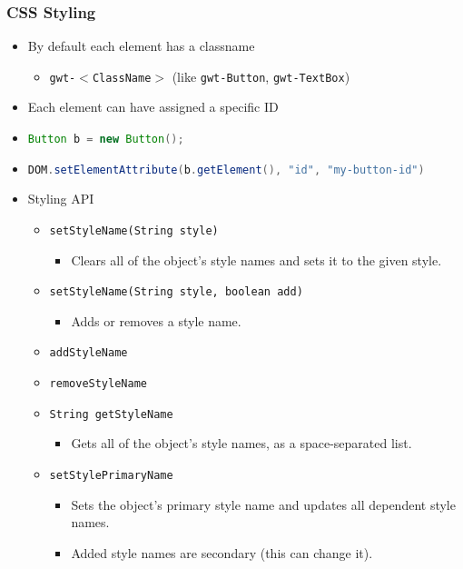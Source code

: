 \documentclass[10pt,table, xcolor=pdflatex]{beamer}
\newcommand{\inlinejava}{\lstinline[language={Java}]}
\begin{document}
    
\begin{frame}[fragile]\frametitle{CSS Styling}
	\begin{itemize}
		\item By default each element has a classname
          \begin{itemize}
        	\item \texttt{gwt-$<$ClassName$>$} (like \texttt{gwt-Button}, \texttt{gwt-TextBox})
          \end{itemize}
        \item Each element can have assigned a specific ID
        \lstset{basicstyle=\ttfamily}
        \item[] \inlinejava{Button b = new Button();}
        \item[] \inlinejava{DOM.setElementAttribute(b.getElement(), "id", "my-button-id")}
        \item Styling API
          \begin{itemize}
            \item \texttt{setStyleName(String style)}
              \begin{itemize}
                \item Clears all of the object's style names and sets it to the given style. 
              \end{itemize}
        	\item \texttt{setStyleName(String style, boolean add)}
              \begin{itemize}
                \item Adds or removes a style name.
              \end{itemize}
        	\item \texttt{addStyleName}
        	\item \texttt{removeStyleName}
        	\item \texttt{String getStyleName}
              \begin{itemize}
                \item Gets all of the object's style names, as a space-separated list.
              \end{itemize}
        	\item \texttt{setStylePrimaryName}
              \begin{itemize}
            	\item Sets the object's primary style name and updates all dependent style names.
            	\item Added style names are secondary (this can change it).

\end{itemize}
\end{itemize}
\end{itemize}
\end{frame}
\end{document}
